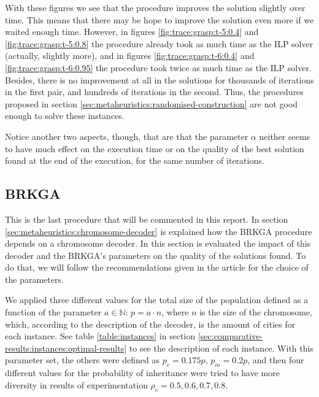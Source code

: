 With these figures we see that the procedure improves the solution slightly over time. This
means that there may be hope to improve the solution even more if we waited enough time.
However, in figures \ref{fig:trace:grasp:t-5:0.4} and \ref{fig:trace:grasp:t-5:0.8} the
procedure already took as much time as the ILP solver (actually, slightly more), and in figures
\ref{fig:trace:grasp:t-6:0.4} and \ref{fig:trace:grasp:t-6:0.95} the procedure took twice as
much time as the ILP solver. Besides, there is no improvement at all in the solutions for
thousands of iterations in the first pair, and hundreds of iterations in the second. Thus, the
procedures proposed in section \ref{sec:metaheuristics:randomised-construction} are not good
enough to solve these instances.

\hfill

Notice another two aspects, though, that are that the parameter $\alpha$ neither seems to have
much effect on the execution time or on the quality of the best solution found at the end of
the execution, for the same number of iterations.

\subsection{BRKGA}
\label{sec:comparative-results:brkga}

This is the last procedure that will be commented in this report. In section
\ref{sec:metaheuristics:chromosome-decoder} is explained how the BRKGA procedure depends on a
chromosome decoder. In this section is evaluated the impact of this decoder and the BRKGA's
parameters on the quality of the solutions found. To do that, we will follow the
recommendations given in the article \cite{brkga} for the choice of the parameters.

\hfill

We applied three different values for the total size of the population defined as a function
of the parameter $a \in \mathbb{N}$: $p = a \cdot n$, where $n$ is the size of the chromosome,
which, according to the description of the decoder, is the amount of cities for each instance.
See table \ref{table:instances} in section
\ref{sec:comparative-results:instances:optimal-results} to see the description of each
instance. With this parameter set, the others were defined as $p_e = 0.175p$, $p_m = 0.2p$,
and then four different values for the probability of inheritance were tried to have more
diversity in results of experimentation $\rho_e = 0.5, 0.6, 0.7, 0.8$.

